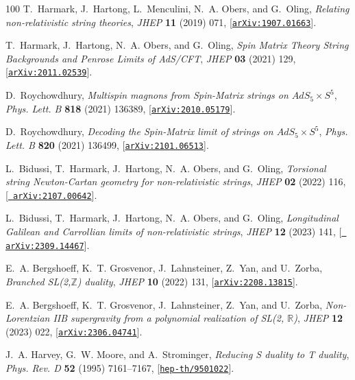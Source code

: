 \documentclass[11pt]{article}
\begin{document}
\begin{thebibliography}{100}
T.~Harmark, J.~Hartong, L.~Menculini, N.~A. Obers, and G.~Oling, {\it {Relating
  non-relativistic string theories}},  {\em JHEP} {\bf 11} (2019) 071,
  [\href{http://arxiv.org/abs/1907.01663}{{\tt arXiv:1907.01663}}].

T.~Harmark, J.~Hartong, N.~A. Obers, and G.~Oling, {\it {Spin Matrix Theory
  String Backgrounds and Penrose Limits of AdS/CFT}},  {\em JHEP} {\bf 03}
  (2021) 129, [\href{http://arxiv.org/abs/2011.02539}{{\tt arXiv:2011.02539}}].

D.~Roychowdhury, {\it {Multispin magnons from Spin-Matrix strings on $ AdS_5
  \times S^5 $}},  {\em Phys. Lett. B} {\bf 818} (2021) 136389,
  [\href{http://arxiv.org/abs/2010.05179}{{\tt arXiv:2010.05179}}].

D.~Roychowdhury, {\it {Decoding the Spin-Matrix limit of strings on $ AdS_5
  \times S^5 $}},  {\em Phys. Lett. B} {\bf 820} (2021) 136499,
  [\href{http://arxiv.org/abs/2101.06513}{{\tt arXiv:2101.06513}}].

L.~Bidussi, T.~Harmark, J.~Hartong, N.~A. Obers, and G.~Oling, {\it {Torsional
  string Newton-Cartan geometry for non-relativistic strings}},  {\em JHEP}
  {\bf 02} (2022) 116, [\href{http://arxiv.org/abs/2107.00642}{{\tt
  arXiv:2107.00642}}].

L.~Bidussi, T.~Harmark, J.~Hartong, N.~A. Obers, and G.~Oling, {\it
  {Longitudinal Galilean and Carrollian limits of non-relativistic strings}},
  {\em JHEP} {\bf 12} (2023) 141, [\href{http://arxiv.org/abs/2309.14467}{{\tt
  arXiv:2309.14467}}].

E.~A. Bergshoeff, K.~T. Grosvenor, J.~Lahnsteiner, Z.~Yan, and U.~Zorba, {\it
  {Branched SL(2,\ensuremath{\mathbb{Z}}) duality}},  {\em JHEP} {\bf 10}
  (2022) 131, [\href{http://arxiv.org/abs/2208.13815}{{\tt arXiv:2208.13815}}].

E.~A. Bergshoeff, K.~T. Grosvenor, J.~Lahnsteiner, Z.~Yan, and U.~Zorba, {\it
  {Non-Lorentzian IIB supergravity from a polynomial realization of SL(2,
  \ensuremath{\mathbb{R}})}},  {\em JHEP} {\bf 12} (2023) 022,
  [\href{http://arxiv.org/abs/2306.04741}{{\tt arXiv:2306.04741}}].

J.~A. Harvey, G.~W. Moore, and A.~Strominger, {\it {Reducing S duality to T
  duality}},  {\em Phys. Rev. D} {\bf 52} (1995) 7161--7167,
  [\href{http://arxiv.org/abs/hep-th/9501022}{{\tt hep-th/9501022}}].


\end{thebibliography}
\end{document}
